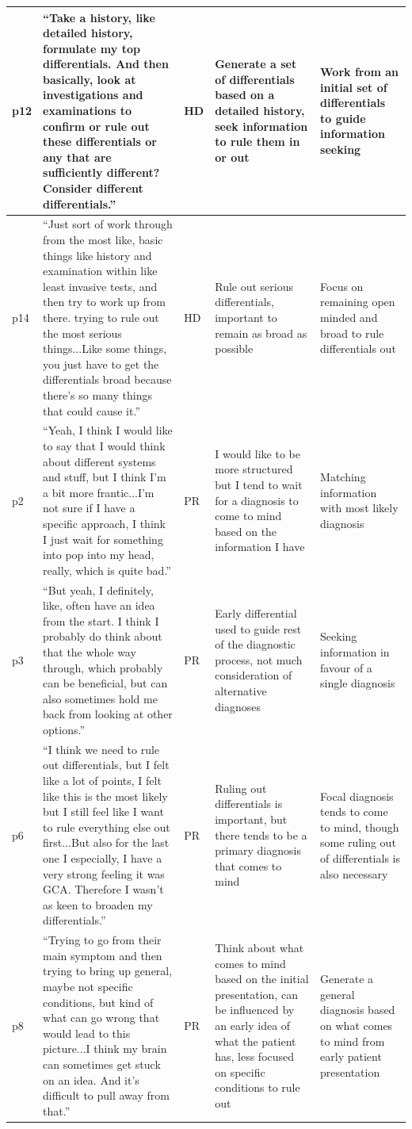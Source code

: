 \documentclass[a4paper, nobind]{templates/ociamthesis}
\begin{document}
\begin{longtable}[t]{>{\raggedright\arraybackslash}p{5em}|>{\raggedright\arraybackslash}p{14em}|>{\raggedright\arraybackslash}p{3em}|>{\raggedright\arraybackslash}p{6em}|>{\raggedright\arraybackslash}p{6em}}
\hline
p12 & “Take a history, like detailed history, formulate my top differentials. And then basically, look at investigations and examinations to confirm or rule out these differentials or any that are sufficiently different? Consider different differentials.” & HD & Generate a set of differentials based on a detailed history, seek information to rule them in or out & Work from an initial set of differentials to guide information seeking\\
\hline
p14 & “Just sort of work through from the most like, basic things like history and examination within like least invasive tests, and then try to work up from there. trying to rule out the most serious things...Like some things, you just have to get the differentials broad because there's so many things that could cause it.” & HD & Rule out serious differentials, important to remain as broad as possible & Focus on remaining open minded and broad to rule differentials out\\
\hline
p2 & “Yeah, I think I would like to say that I would think about different systems and stuff, but I think I'm a bit more frantic...I'm not sure if I have a specific approach, I think I just wait for something into pop into my head, really, which is quite bad.” & PR & I would like to be more structured but I tend to wait for a diagnosis to come to mind based on the information I have & Matching information with most likely diagnosis\\
\hline
p3 & “But yeah, I definitely, like, often have an idea from the start. I think I probably do think about that the whole way through, which probably can be beneficial, but can also sometimes hold me back from looking at other options.” & PR & Early differential used to guide rest of the diagnostic process, not much consideration of alternative diagnoses & Seeking information in favour of a single diagnosis\\
\hline
p6 & “I think we need to rule out differentials, but I felt like a lot of points, I felt like this is the most likely but I still feel like I want to rule everything else out first...But also for the last one I especially, I have a very strong feeling it was GCA. Therefore I wasn't as keen to broaden my differentials.” & PR & Ruling out differentials is important, but there tends to be a primary diagnosis that comes to mind & Focal diagnosis tends to come to mind, though some ruling out of differentials is also necessary\\
\hline
p8 & “Trying to go from their main symptom and then trying to bring up general, maybe not specific conditions, but kind of what can go wrong that would lead to this picture...I think my brain can sometimes get stuck on an idea. And it's difficult to pull away from that.” & PR & Think about what comes to mind based on the initial presentation, can be influenced by an early idea of what the patient has, less focused on specific conditions to rule out & Generate a general diagnosis based on what comes to mind from early patient presentation\\

\end{longtable}
\end{document}
